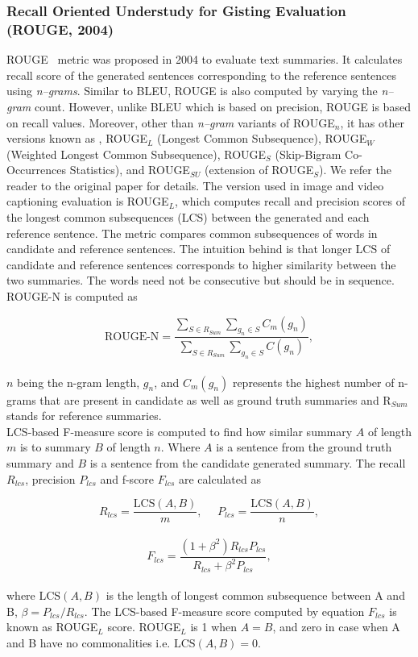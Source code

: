 \documentclass[10pt,journal,compsoc]{IEEEtran}
\begin{document}
\subsubsection{Recall Oriented Understudy for Gisting Evaluation (ROUGE, 2004)}
ROUGE~\cite{lin2004rouge} metric was proposed in 2004 to evaluate text summaries. It calculates recall score of the generated sentences corresponding to the reference sentences using \textit{n--grams}. Similar to BLEU, ROUGE is also computed by varying the \textit{n--gram} count. However, unlike BLEU which is based on precision, ROUGE is based on recall values. Moreover, other than \textit{n--gram} variants of ROUGE$_n$, it has other versions known as , ROUGE$_L$ (Longest Common Subsequence), ROUGE$_W$ (Weighted Longest Common Subsequence), ROUGE$_S$ (Skip-Bigram Co-Occurrences Statistics), and ROUGE$_{SU}$ (extension of ROUGE$_S$). We refer the reader to the original paper for details. The version used in image and video captioning evaluation is ROUGE$_L$, which computes recall and precision scores of the longest common subsequences (LCS) between the generated and each reference sentence. The metric compares common subsequences of words in candidate and reference sentences. The intuition behind is that longer LCS of candidate and reference sentences corresponds to higher similarity between the two summaries. The words need not be consecutive but should be in sequence. ROUGE-N is computed as 

\vspace{-2mm}

$$\text{ROUGE-N}= \frac{\sum\limits_{S\in{R_{Sum}}}^{}\sum\limits_{g_n\in{S}}^{}C_{m}(g_n)}{\sum\limits_{S\in{R_{Sum}}}^{}\sum\limits_{g_n\in{S}}^{}C(g_n)},$$ \\
$n$ being the n-gram length, $g_n$, and $C_{m}(g_n)$ represents the highest number of n-grams that are present in candidate as well as ground truth summaries and R$_{Sum}$ stands for reference summaries. \\

LCS-based F-measure score is computed to find how similar summary $A$ of length $m$ is to summary $B$ of length $n$. Where $A$ is a sentence from the ground truth summary and $B$ is a sentence from the candidate generated summary. The recall $R_{lcs}$, precision $P_{lcs}$ and f-score $F_{lcs}$ are calculated as 
\vspace{-2mm}

$$R_{lcs} = \frac{\text{LCS}(A,B)}{m}, ~~~~~~ P_{lcs} = \frac{\text{LCS}(A,B)}{n},$$\\
\vspace{-3mm}
$$F_{lcs} = \frac{(1+\beta^2)R_{lcs}P_{lcs}}{R_{lcs} + \beta^2P_{lcs}},$$\\
where $\text{LCS}(A,B)$ is the length of longest common subsequence between A and B, $\beta = P_{lcs}/R_{lcs}$. The LCS-based F-measure score computed by equation $F_{lcs}$ is known as ROUGE$_L$ score. ROUGE$_L$ is 1 when $A=B$, and zero in case when A and B have no commonalities i.e. $\text{LCS}(A,B)=0$.
\end{document}
